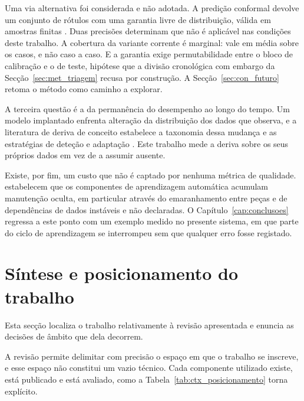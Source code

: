 Uma via alternativa foi considerada e não adotada. A predição conformal devolve um conjunto de
rótulos com uma garantia livre de distribuição, válida em amostras finitas
\autocite{vovk2005algorithmic, angelopoulos2023conformal}. Duas precisões determinam que não é aplicável nas condições deste trabalho. A cobertura da
variante corrente é marginal: vale em média sobre os casos, e não caso a caso. E a garantia exige
permutabilidade entre o bloco de calibração e o de teste, hipótese que a divisão cronológica com
embargo da Secção~\ref{sec:met_triagem} recusa por construção. A Secção~\ref{sec:con_futuro} retoma o método
como caminho a explorar.

A terceira questão é a da permanência do desempenho ao longo do tempo. Um modelo implantado enfrenta
alteração da distribuição dos dados que observa, e a literatura de deriva de conceito estabelece a
taxonomia dessa mudança e as estratégias de deteção e adaptação \autocite{gama2014survey}. Este
trabalho mede a deriva sobre os seus próprios dados em vez de a assumir ausente.

Existe, por fim, um custo que não é captado por nenhuma métrica de qualidade.
\textcite{sculley2015debt} estabelecem que os componentes de aprendizagem automática acumulam
manutenção oculta, em particular através do emaranhamento entre peças e de dependências de dados
instáveis e não declaradas. O Capítulo~\ref{cap:conclusoes} regressa a este ponto com um exemplo
medido no presente sistema, em que parte do ciclo de aprendizagem se interrompeu sem que qualquer
erro fosse registado.

\section{Síntese e posicionamento do trabalho}
\label{sec:ctx_sintese}

Esta secção localiza o trabalho relativamente à revisão apresentada e enuncia as decisões de âmbito
que dela decorrem.

A revisão permite delimitar com precisão o espaço em que o trabalho se inscreve, e esse espaço não
constitui um vazio técnico. Cada componente utilizado existe, está publicado e está avaliado, como
a Tabela~\ref{tab:ctx_posicionamento} torna explícito.

